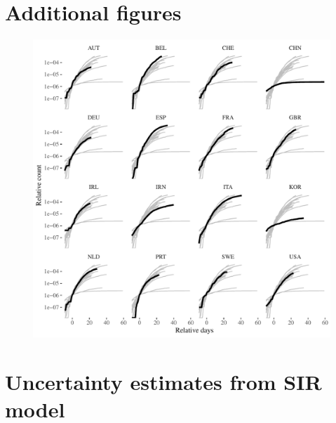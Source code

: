 \documentclass[fullpage,a4paper]{article}
\newcommand{\beginsupplement}{%
  \setcounter{table}{0}
  \renewcommand{\thetable}{S\arabic{table}}%
  \setcounter{figure}{0}
  \renewcommand{\thefigure}{S\arabic{figure}}%
}
\begin{document}



\clearpage

\appendix
\renewcommand\appendixname{Supplement}
\beginsupplement

\section{Additional figures}

\begin{figure}
  \includegraphics[width=1\textwidth]{../figs/ecdc_aligned_onepermill_nyt.pdf}
  \caption{\label{fig:align_nyt}}
\end{figure}

\section{Uncertainty estimates from SIR model}
\end{document}
